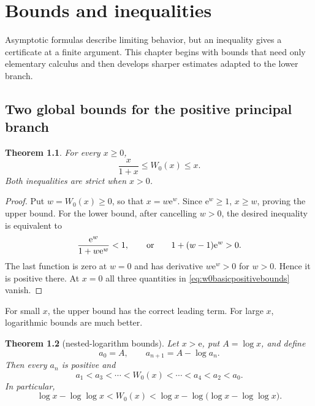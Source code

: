 \documentclass[11pt,oneside]{book}
\newtheorem{theorem}{Theorem}[chapter]
\theoremstyle{definition}
\theoremstyle{remark}
\newcommand{\ee}{\mathrm e}
\begin{document}
\chapter{Bounds and inequalities}\label{ch:bounds}

Asymptotic formulas describe limiting behavior, but an inequality gives a
certificate at a finite argument.  This chapter begins with bounds that need
only elementary calculus and then develops sharper estimates adapted to the
lower branch.

\section{Two global bounds for the positive principal branch}

\begin{theorem}\label{thm:w0basicpositivebounds}
For every $x\ge0$,
\begin{equation}\label{eq:w0basicpositivebounds}
 \frac{x}{1+x}\le W_0(x)\le x.
\end{equation}
Both inequalities are strict when $x>0$.
\end{theorem}

\begin{proof}
Put $w=W_0(x)\ge0$, so that $x=w\ee^w$.  Since $\ee^w\ge1$,
$x\ge w$, proving the upper bound.  For the lower bound, after cancelling
$w>0$, the desired inequality is equivalent to
\[
 \frac{\ee^w}{1+w\ee^w}<1,
 \qquad\hbox{or}\qquad
 1+(w-1)\ee^w>0.
\]
The last function is zero at $w=0$ and has derivative $w\ee^w>0$ for
$w>0$.  Hence it is positive there.  At $x=0$ all three quantities in
\eqref{eq:w0basicpositivebounds} vanish.
\end{proof}

For small $x$, the upper bound has the correct leading term.  For large $x$,
logarithmic bounds are much better.

\begin{theorem}[nested-logarithm bounds]\label{thm:nestedlogbounds}
Let $x>\ee$, put $A=\log x$, and define
\begin{equation}\label{eq:nestedlogiterates}
 a_0=A,
 \qquad
 a_{n+1}=A-\log a_n.
\end{equation}
Then every $a_n$ is positive and
\begin{equation}\label{eq:alternatingbounds}
 a_1<a_3<\cdots<W_0(x)<\cdots<a_4<a_2<a_0.
\end{equation}
In particular,
\begin{equation}\label{eq:firstnestedbounds}
 \log x-\log\log x
 <W_0(x)
 <\log x-\log\bigl(\log x-\log\log x\bigr).
\end{equation}
\end{theorem}
\end{document}
